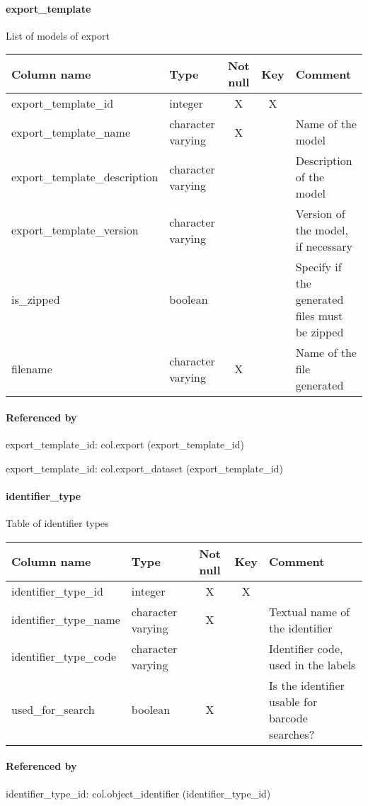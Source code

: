 \paragraph{export\_template}
List of models of export

\begin{tabular}{|l| p{2cm}|c|c| p{5cm}|}
\hline
Column name & Type & Not null & Key & Comment \\
\hline
export\_template\_id & integer & X & X & \\
export\_template\_name & character varying & X &  & Name of the model\\
export\_template\_description & character varying &  &  & Description of the model\\
export\_template\_version & character varying &  &  & Version of the model, if necessary\\
is\_zipped & boolean &  &  & Specify if the generated files must be zipped\\
filename & character varying & X &  & Name of the file generated\\
\hline
\end{tabular}
\paragraph{Referenced by}
export\_template\_id: col.export (export\_template\_id)

export\_template\_id: col.export\_dataset (export\_template\_id)

\paragraph{identifier\_type}
Table of identifier types

\begin{tabular}{|l| p{2cm}|c|c| p{5cm}|}
\hline
Column name & Type & Not null & Key & Comment \\
\hline
identifier\_type\_id & integer & X & X & \\
identifier\_type\_name & character varying & X &  & Textual name of the identifier\\
identifier\_type\_code & character varying &  &  & Identifier code, used in the labels\\
used\_for\_search & boolean & X &  & Is the identifier usable for barcode searches?\\
\hline
\end{tabular}
\paragraph{Referenced by}
identifier\_type\_id: col.object\_identifier (identifier\_type\_id)

